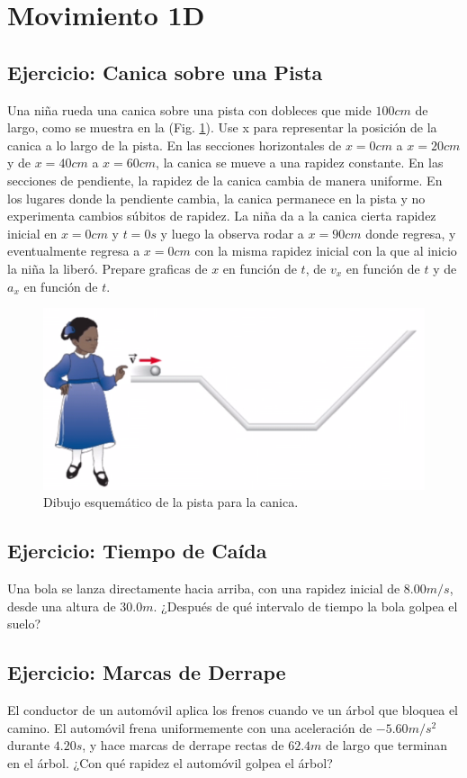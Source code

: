 \documentclass{replab}
\begin{document}
	\section{Movimiento 1D}

	\subsection{Ejercicio: Canica sobre una Pista}
	Una niña rueda una canica sobre una pista con dobleces que mide $100cm$ de largo, como se muestra en la (Fig. \ref{fig:pista2}). Use x para representar la posición de la canica a lo largo de la pista. En las secciones horizontales de $x=0cm$ a $x=20cm$ y de $x=40cm$ a $x=60cm$, la canica se mueve a una rapidez constante. En las secciones de pendiente, la rapidez de la canica cambia de manera uniforme. En los lugares donde la pendiente cambia, la canica permanece en la pista y no experimenta cambios súbitos de rapidez. La niña da a la canica cierta rapidez inicial en $x=0cm$ y $t=0s$ y luego la observa rodar a $x=90cm$ donde regresa, y eventualmente regresa a $x=0cm$ con la misma rapidez inicial con la que al inicio la niña la liberó. Prepare graficas de $x$ en función de $t$, de $v_x$ en función de $t$ y de $a_x$ en función de $t$. 
	
	\begin{figure}[htbp]
		\centering
		\includegraphics[width=.4\columnwidth]{imagenes/pista2.png}
		\caption{Dibujo esquemático de la pista para la canica.}
		\label{fig:pista2}
	\end{figure}

	\subsection{Ejercicio: Tiempo de Caída}
	Una bola se lanza directamente hacia arriba, con una rapidez inicial de $8.00m/s$, desde una altura de $30.0m$. ¿Después de qué intervalo de tiempo la bola golpea el suelo?
	
	\subsection{Ejercicio: Marcas de Derrape}
	El conductor de un automóvil aplica los frenos cuando ve un árbol que bloquea el camino. El automóvil frena uniformemente con una aceleración de $-5.60m/s^2$ durante $4.20s$, y hace marcas de derrape rectas de $62.4m$ de largo que terminan en el árbol. ¿Con qué rapidez el automóvil golpea el árbol?
\end{document}
